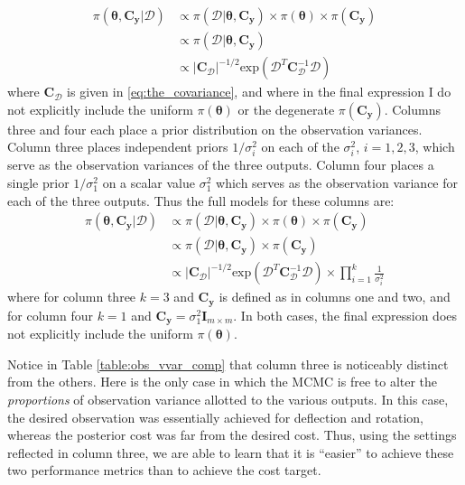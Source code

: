 \documentclass{article}
\begin{document}
\begin{equation}\label{eq:full_model_1}
\begin{aligned}
\pi(\boldsymbol\theta,\mathbf C_{\mathbf y}|\mathcal D) &\propto \pi(\mathcal D|\boldsymbol\theta,\mathbf C_{\mathbf y}) \times \pi(\boldsymbol\theta) \times \pi(\mathbf C_{\mathbf y})\\
&\propto \pi(\mathcal D|\boldsymbol\theta,\mathbf C_{\mathbf y}) \\
&\propto \lvert \mathbf C_{\mathcal D} \rvert ^{-1/2} \mathrm{exp}(\mathcal D^T \mathbf C_{\mathcal D}^{-1} \mathcal D)
\end{aligned}
\end{equation}
where $\mathbf C_{\mathcal D}$ is given in \eqref{eq:the_covariance}, and where in the final expression I do not explicitly include the uniform $\pi(\boldsymbol\theta)$ or the degenerate $\pi(\mathbf C_{\mathbf y})$.
Columns three and four each place a prior distribution on the observation variances. Column three places independent priors $1/\sigma^2_i$ on each of the $\sigma^2_i$, $i=1,2,3$, which serve as the observation variances of the three outputs. Column four places a single prior $1/\sigma^2_1$ on a scalar value $\sigma^2_1$ which serves as the observation variance for each of the three outputs. Thus the full models for these columns are:
\begin{equation}\label{eq:full_model_2}
\begin{aligned}
\pi(\boldsymbol\theta,\mathbf C_{\mathbf y}|\mathcal D ) &\propto
\pi(\mathcal D|\boldsymbol\theta,\mathbf C_{\mathbf y}) \times \pi(\boldsymbol\theta) \times \pi(\mathbf C_{\mathbf y})\\
&\propto  \pi(\mathcal D|\boldsymbol\theta,\mathbf C_{\mathbf y}) \times \pi(\mathbf C_{\mathbf y})\\
&\propto \lvert \mathbf C_{\mathcal D} \rvert ^{-1/2} \mathrm{exp}(\mathcal D^T \mathbf C_{\mathcal D}^{-1} \mathcal D) \times \prod_{i=1}^k \frac1{\sigma^2_i}
\end{aligned}
\end{equation}
where for column three $k=3$ and $\mathbf C_{\mathbf y}$ is defined as in columns one and two, and for column four $k=1$ and $\mathbf C_{\mathbf y}=\sigma^2_1 \mathbf I_{m\times m}$. In both cases, the final expression does not explicitly include the uniform $\pi(\boldsymbol\theta)$.

Notice in Table \ref{table:obs_vvar_comp} that column three is noticeably distinct from the others. Here is the only case in which the MCMC is free to alter the \emph{proportions} of observation variance allotted to the various outputs. In this case, the desired observation was essentially achieved for deflection and rotation, whereas the posterior cost was far from the desired cost. Thus, using the settings reflected in column three, we are able to learn that it is ``easier'' to achieve these two performance metrics than to achieve the cost target.
\end{document}
